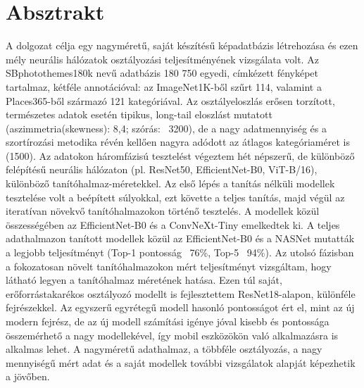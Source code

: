 \chapter{Absztrakt}
\label{ch:abstract}

A dolgozat célja egy nagyméretű, saját készítésű képadatbázis létrehozása és ezen mély neurális hálózatok osztályozási teljesítményének vizsgálata volt. 
Az SBphotothemes180k nevű adatbázis 180 750 egyedi, címkézett fényképet tartalmaz, kétféle annotációval: az ImageNet1K-ből szűrt 114, valamint a Places365-ből származó 121 kategóriával. Az osztályeloszlás erősen torzított, természetes adatok esetén tipikus, long-tail eloszlást mutatott (aszimmetria(skewness): 8,4; szórás: ~3200), de a nagy adatmennyiség és a szortírozási metodika révén kellően nagyra adódott az átlagos kategóriaméret is (1500). 
Az adatokon háromfázisú tesztelést végeztem hét népszerű, de különböző felépítésű neurális hálózaton (pl. ResNet50, EfficientNet-B0, ViT-B/16), különböző tanítóhalmaz-méretekkel. 
Az első lépés a tanítás nélküli modellek tesztelése volt a beépített súlyokkal, ezt követte a teljes tanítás, majd végül az iteratívan növekvő tanítóhalmazokon történő tesztelés. A modellek közül összességében az EfficientNet-B0 és a ConvNeXt-Tiny emelkedtek ki. A teljes adathalmazon tanított modellek közül az EfficientNet-B0 és a NASNet mutatták a legjobb teljesítményt (Top-1 pontosság ~76\%, Top-5 ~94\%). Az utolsó fázisban a fokozatosan növelt tanítóhalmazokon mért teljesítményt vizsgáltam, hogy látható legyen a tanítóhalmaz méretének hatása.
Ezen túl saját, erőforrástakarékos osztályozó modellt is fejlesztettem ResNet18-alapon, különféle fejrészekkel. Az egyszerű egyrétegű modell hasonló pontosságot ért el, mint az új modern fejrész, de az új modell számítási igénye jóval kisebb és pontossága összemérhető a nagy modellekével, így mobil eszközökön való alkalmazásra is alkalmas lehet. 
A nagyméretű adathalmaz, a többféle osztályozás, a nagy mennyiségű mért adat és a saját modellek további vizsgálatok alapját képezhetik a jövőben.
